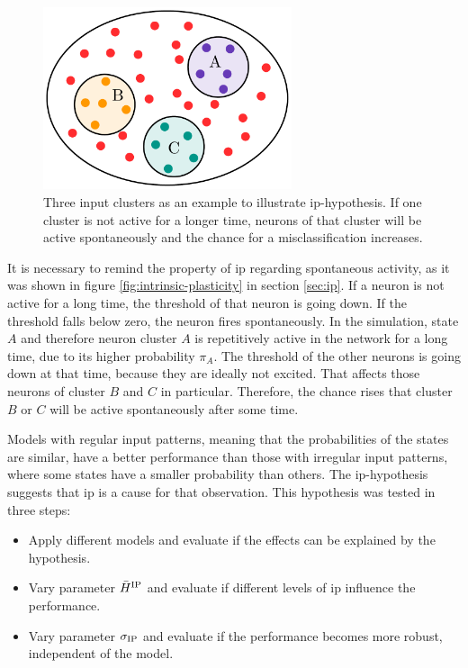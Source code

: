 \begin{figure}[!t]
	\centering
	\includegraphics[width=0.65\textwidth]{results/sorn_cluster}
	\caption[Input clusters example]{Three input clusters as an example to illustrate \acs{ip}-hypothesis. If one cluster is not active for a longer time, neurons of that cluster will be active spontaneously and the chance for a misclassification increases.}
	\label{fig:sorn-clusters}
\end{figure}

It is necessary to remind the property of \acs{ip} regarding spontaneous activity, as it was shown in figure \ref{fig:intrinsic-plasticity} in section \ref{sec:ip}. If a neuron is not active for a long time, the threshold of that neuron is going down. If the threshold falls below zero, the neuron fires spontaneously. In the simulation, state $A$ and therefore neuron cluster $A$ is repetitively active in the network for a long time, due to its higher probability $\pi_A$. The threshold of the other neurons is going down at that time, because they are ideally not excited. That affects those neurons of cluster $B$ and $C$ in particular. Therefore, the chance rises that cluster $B$ or $C$ will be active spontaneously after some time.

Models with regular input patterns, meaning that the probabilities of the states are similar, have a better performance than those with irregular input patterns, where some states have a smaller probability than others. The \acs{ip}-hypothesis suggests that \acl{ip} is a cause for that observation. This hypothesis was tested in three steps:

\begin{itemize}
\item Apply different models and evaluate if the effects can be explained by the hypothesis.
\item Vary parameter $\bar H^{\text{IP}}$ and evaluate if different levels of \acl{ip} influence the performance.
\item Vary parameter $\sigma_{\text{IP}}$ and evaluate if the performance becomes more robust, independent of the model.
\end{itemize}

